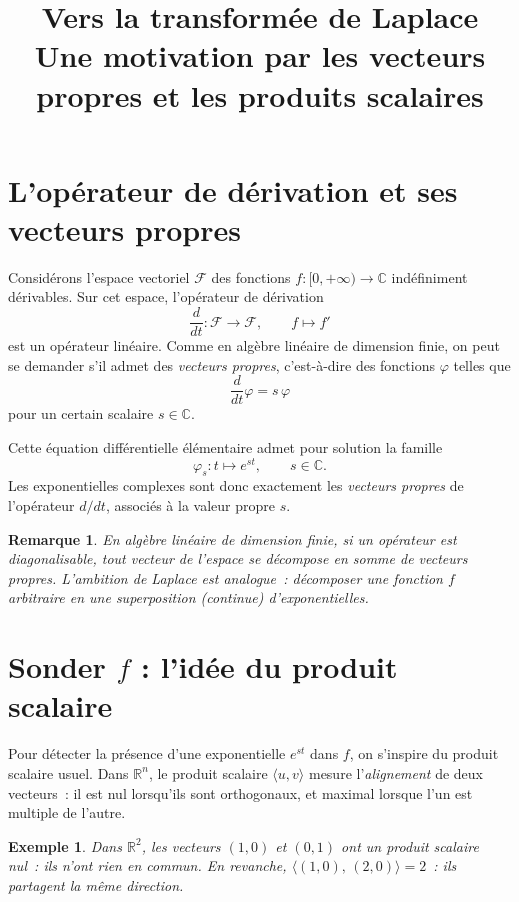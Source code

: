 \documentclass[11pt, a4paper]{article}
\title{\textbf{Vers la transform\'{e}e de Laplace}\\
\large Une motivation par les vecteurs propres et les produits scalaires}
\author{}
\date{}
\theoremstyle{plain_style}
\newtheorem{remarque}{Remarque}
\newtheorem{exemple}{Exemple}
\begin{document}
\maketitle

\section{L'op\'{e}rateur de d\'{e}rivation et ses vecteurs propres}

Consid\'{e}rons l'espace vectoriel $\mathcal{F}$ des fonctions
$f : [0, +\infty) \to \mathbb{C}$ ind\'{e}finiment d\'{e}rivables.
Sur cet espace, l'op\'{e}rateur de d\'{e}rivation
\[
  \frac{d}{dt} : \mathcal{F} \longrightarrow \mathcal{F},
  \qquad f \longmapsto f'
\]
est un op\'{e}rateur lin\'{e}aire. Comme en alg\`{e}bre lin\'{e}aire de dimension finie,
on peut se demander s'il admet des \emph{vecteurs propres}, c'est-\`{a}-dire des fonctions
$\varphi$ telles que
\[
  \frac{d}{dt}\varphi = s\,\varphi
\]
pour un certain scalaire $s \in \mathbb{C}$.

Cette \'{e}quation diff\'{e}rentielle \'{e}l\'{e}mentaire admet pour solution la famille
\[
  \varphi_s : t \longmapsto e^{st}, \qquad s \in \mathbb{C}.
\]
Les exponentielles complexes sont donc exactement les \emph{vecteurs propres} de l'op\'{e}rateur
$d/dt$, associ\'{e}s \`{a} la valeur propre $s$.

\begin{remarque}
En alg\`{e}bre lin\'{e}aire de dimension finie, si un op\'{e}rateur est diagonalisable,
tout vecteur de l'espace se d\'{e}compose en somme de vecteurs propres.
L'ambition de Laplace est analogue~: d\'{e}composer une fonction $f$ arbitraire en une
superposition (continue) d'exponentielles.
\end{remarque}

\section{Sonder $f$ : l'idée du produit scalaire}
Pour d\'{e}tecter la pr\'{e}sence d'une exponentielle $e^{st}$ dans $f$, on s'inspire du
produit scalaire usuel. Dans $\mathbb{R}^n$, le produit scalaire $\langle u, v \rangle$ mesure
l'\emph{alignement} de deux vecteurs~: il est nul lorsqu'ils sont orthogonaux, et maximal
lorsque l'un est multiple de l'autre.

\begin{exemple}
Dans $\mathbb{R}^2$, les vecteurs $(1,0)$ et $(0,1)$ ont un produit scalaire nul~:
ils n'ont rien en commun. En revanche,
$\langle (1,0),\,(2,0) \rangle = 2$~: ils partagent la m\^{e}me direction.
\end{exemple}
\end{document}
